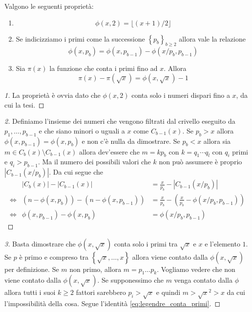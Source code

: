 \begin{teorema}
  Valgono le seguenti proprietà:
  \begin{enumerate}
    \item \begin{equation*}
        \phi(x,2) = \lfloor (x+1)/2 \rfloor
      \end{equation*}
    \item Se indicizziamo i primi come la successione $\left\{p_b
      \right\}_{b\ge 2}$ allora vale la relazione 
      \begin{equation*}
        \phi(x,p_b) = \phi(x,p_{b-1}) - \phi(x/p_{b}, p_{b-1})
      \end{equation*}
    \item Sia $\pi(x)$ la funzione che conta i primi fino ad $x$. 
 		Allora 
 		\begin{equation}
 			\label{eq:legendre_conta_primi}
 			\pi(x) - \pi(\sqrt{x}) = \phi(x,\sqrt{x}) - 1 
 		\end{equation}
  \end{enumerate}
  \label{lemma:proprietà_funz_legendre}
\end{teorema}
\begin{proof}[1]
  La proprietà è ovvia dato che $\phi(x,2)$ conta solo i numeri dispari fino
  a $x$, da cui la tesi.
\end{proof}
\begin{proof}[2]
	Definiamo l'insieme dei numeri che vengono filtrati dal crivello 
	eseguito da $p_1, \dots, p_{b-1}$ e che siano minori o uguali a $x$ come 
	$C_{b-1}(x)$. 
	Se $p_b > x$ allora $\phi(x,p_{b-1}) = \phi(x,p_b)$ e non c'è nulla da dimostrare.
	Se $p_b < x$ allora sia $m \in C_{b}(x) \setminus C_{b-1}(x)$ allora dev'essere che
	$m = k p_b$ con $k = q_1\cdots q_l$ con $q_i$ primi e $q_i > p_{b-1}$. 
	Ma il numero dei possibili valori che $k$ non può assumere è proprio $|C_{b-1}(x/p_b)|$. 
	Da cui segue che
	\begin{equation*}
		\begin{array}{lll}
			& |C_{b}(x)| - |C_{b-1}(x)| & = \frac{x}{p_b} - |C_{b-1}(x/p_b)| \\
			\Leftrightarrow & (n -\phi(x,p_b)) - (n -\phi(x, p_{b-1})) &= \frac{x}{p_b} - \left(\frac{x}{p_b} - \phi(x/p_b, p_{b-1})\right)\\
			\Leftrightarrow & \phi(x,p_{b-1}) - \phi(x,p_b) & = \phi(x/p_b, p_{b-1})
		\end{array}		
	\end{equation*}
\end{proof}
\begin{proof}[3]
	Basta dimostrare che $\phi(x,\sqrt{x})$ conta solo i primi tra $\sqrt{x}$ e $x$ e 
	l'elemento $1$. Se $p$ è primo e compreso tra $\left\{\sqrt{x},\dots, x\right\}$ allora
	viene contato dalla $\phi(x,\sqrt{x})$ per definizione.
	Se $m$ non primo, allora $m = p_1 \dots p_k$. Vogliamo vedere che non viene contato 
	dalla $\phi(x,\sqrt{x})$. Se supponessimo che $m$ venga contato dalla $\phi$ allora 
	tutti i suoi $k \ge 2$ fattori sarebbero $p_i > \sqrt{x}$ e quindi $m > \sqrt{x}^2 > x$ 
	da cui l'impossibilità della cosa. Segue l'identità \eqref{eq:legendre_conta_primi}.       
\end{proof}

